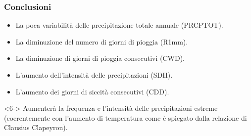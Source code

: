 \begin{frame}[t]
\end{frame} 

		
\begin{frame}	
    \frametitle{Conclusioni}
    \begin{itemize}	
    \item<1-> La poca variabilità delle precipitazione totale annuale (PRCPTOT).
	\item<2-> La diminuzione del numero di giorni di pioggia (R1mm).  %
	\item<3-> La diminuzione di giorni di pioggia consecutivi (CWD).
	\item<4-> L'aumento dell'intensità delle precipitazioni (SDII). 
	\item<5-> L'aumento dei giorni di siccità consecutivi (CDD).
	\end{itemize}

\begin{alertblock}<6->{}
       \setlength\itemsep{0pt}
	  Aumenterà la frequenza e l'intensità delle precipitazioni estreme (coerentemente con l'aumento di temperatura come è spiegato dalla relazione di Clausius Clapeyron).
\end{alertblock}	
\end{frame}	
	
